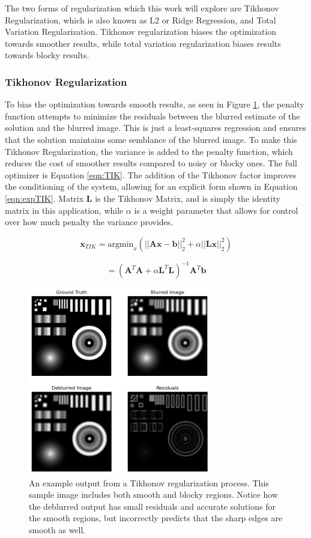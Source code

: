 \documentclass[letterpaper, 11pt, titlepage, twocolumn]{article}
\begin{document}
The two forms of regularization which this work will explore are Tikhonov Regularization, which is also known as L2 or Ridge Regression, and Total Variation Regularization. Tikhonov regularization biases the optimization towards smoother results, while total variation regularization biases results towards blocky results.

\subsubsection{Tikhonov Regularization}
To bias the optimization towards smooth results, as seen in Figure \ref{fig:tik_demo}, the penalty function attempts to minimize the residuals between the blurred estimate of the solution and the blurred image. This is just a least-squares regression and ensures that the solution maintains some semblance of the blurred image. To make this Tikhonov Regularization, the variance is added to the penalty function, which reduces the cost of smoother results compared to noisy or blocky ones. The full optimizer is Equation \eqref{eqn:TIK}. The addition of the Tikhonov factor improves the conditioning of the system, allowing for an explicit form shown in Equation \eqref{eqn:expTIK}. Matrix \textbf{L} is the Tikhonov Matrix, and is simply the identity matrix in this application, while $\alpha$ is a weight parameter that allows for control over how much penalty the variance provides.

\begin{equation}
  \label{eqn:TIK}
  \mathbf{x}_{TIK} = \textrm{argmin}_x\left(||\mathbf{Ax}-\mathbf{b}||^2_2 + \alpha||\mathbf{Lx}||^2_2\right)
\end{equation}

\begin{equation}
  \label{eqn:expTIK}
  = \left(\mathbf{A}^T\mathbf{A} + \alpha \mathbf{L}^T\mathbf{L}\right)^{-1}\mathbf{A}^T\mathbf{b}
\end{equation}

\begin{figure}[H]
  \centering
  \includegraphics[width=8cm]{demo_tik.png}
  \caption{An example output from a Tikhonov regularization process. This sample image includes both smooth and blocky regions. Notice how the deblurred output has small residuals and accurate solutions for the smooth regions, but incorrectly predicts that the sharp edges are smooth as well.}
  \label{fig:tik_demo}
\end{figure}
\end{document}
